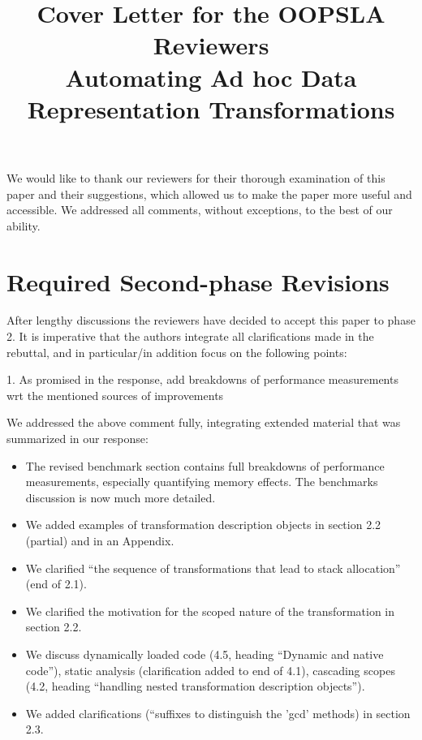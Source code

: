 \documentclass[9pt]{article}
\newenvironment{editorial}
{ \color{Red} \framebox{{\bf REVISION}} }
{  }
\newenvironment{answer}
{ \em \framebox{{\bf AUTHOR RESPONSE}} }
{  }
\begin{document}
\title{Cover Letter for the OOPSLA Reviewers\\\Large Automating Ad hoc Data Representation Transformations}
\maketitle

We would like to thank our reviewers for their thorough examination of this paper and their suggestions, which allowed us to make the paper more useful and accessible. We addressed all comments, without exceptions, to the best of our ability.


\newpage

\section{Required Second-phase Revisions}


\begin{editorial}
After lengthy discussions the reviewers have decided to accept this paper to phase 2. It is imperative that the authors integrate all clarifications made in the rebuttal, and in particular/in addition focus on the following points:

1. As promised in the response, add breakdowns of performance measurements wrt the mentioned sources of improvements
\end{editorial}

\begin{answer}

We addressed the above comment fully, integrating extended material that was summarized in our
response:

\begin{itemize}
\item The revised benchmark section contains full breakdowns of performance measurements, especially
quantifying memory effects. The benchmarks discussion is now much more detailed.

\item We added examples of transformation description objects in section 2.2 (partial) and in an Appendix.
\item We clarified ``the sequence of transformations that lead to stack allocation'' (end of 2.1).
\item We clarified the motivation for the scoped nature of the transformation in section 2.2.
\item We discuss dynamically loaded code (4.5, heading ``Dynamic and native code''), static analysis
  (clarification added to end of 4.1), cascading scopes (4.2, heading ``handling nested transformation description objects'').
\item We added clarifications (``suffixes to distinguish the 'gcd' methods) in section 2.3.
\end{itemize}

\end{answer}
\end{document}
